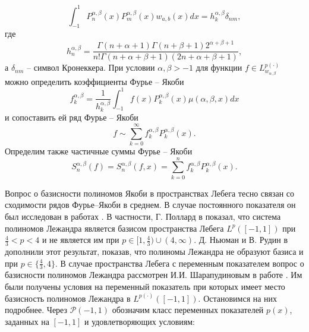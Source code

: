 \begin{equation}\label{JacobiOrthognality}
	\int_{-1}^1P_n^{\alpha,\beta}(x)P_m^{\alpha,\beta}(x)w_{a,b}(x)dx=h_k^{\alpha,\beta}\delta_{nm},
\end{equation}
где 
$$
h_n^{\alpha,\beta} =
\frac{\Gamma(n+\alpha+1)\Gamma(n+\beta+1)2^{\alpha+\beta+1}}
{n!\Gamma(n+\alpha+\beta+1)(2n+\alpha+\beta+1)},
$$
а $\delta_{nm}$ -- символ Кронеккера.
При условии $\alpha,\beta>-1$ для функции $f\in L^{p(\cdot)}_{w_{\alpha,\beta}}$ можно определить коэффициенты Фурье -- Якоби
$$
f_k^{\alpha,\beta}=\frac{1}{h_k^{\alpha,\beta}}\int_{-1}^1f(x)P_k^{\alpha,\beta}(x)
\mu(\alpha,\beta,x)dx
$$
и сопоставить ей ряд Фурье -- Якоби
$$
f\sim \sum_{k=0}^\infty f_k^{\alpha,\beta}P_k^{\alpha,\beta}(x).
$$
Определим также частичные суммы Фурье -- Якоби
$$
S_n^{\alpha,\beta}(f)=S_n^{\alpha,\beta}(f,x)=\sum_{k=0}^nf_k^{\alpha,\beta}P_k^{\alpha,\beta}(x).
$$

 Вопрос о базисности полиномов Якоби в пространствах Лебега тесно связан со сходимости рядов Фурье--Якоби в среднем. В случае постоянного показателя он был исследован в работах \cite{tad-Pollard-1,tad-Pollard-2,tad-Pollard-3,tad-Newman-Rudin,tad-Muckenhoupt}. В частности, Г. Поллард в  \cite{tad-Pollard-1} показал, что система полиномов Лежандра является базисом пространства Лебега $L^p([-1,1])$ при $\frac43<p<4$ и не является им при $p\in[1,\frac43)\cup(4,\infty)$. Д. Ньюман и В. Рудин в \cite{tad-Newman-Rudin} дополнили этот результат, показав, что полиномы Лежандра не образуют базиса и при $p \in \{\frac43, 4\}$. В случае пространства Лебега с переменным показателем вопрос о базисности полиномов Лежандра рассмотрен И.И. Шарапудиновым в работе \cite{tad-SHII-Leg}. Им были получены условия на переменный показатель при которых имеет место базисность полиномов Лежандра в $L^{p(\cdot)}([-1,1])$. Остановимся на них подробнее. Через $\mathcal{P}(-1,1)$ обозначим класс переменных показателей $p(x)$, заданных на $[-1,1]$ и удовлетворяющих условиям:

